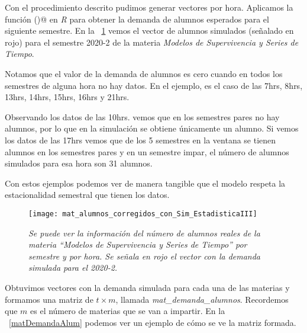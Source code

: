 Con el procedimiento descrito pudimos generar vectores por hora. Aplicamos la función \verb@hw()@ en \textit{R} para obtener la demanda de alumnos esperados para el siguiente semestre. En la \figurename{~\ref{matAl_corregidos_y_sim}} vemos el vector de alumnos simulados (señalado en rojo) para el semestre 2020-2 de la materia \textit{Modelos de Supervivencia y Series de Tiempo}.

Notamos que el valor de la demanda de alumnos es cero cuando en todos los semestres de alguna hora no hay datos. En el ejemplo, es el caso de las 7hrs, 8hrs, 13hrs, 14hrs, 15hrs, 16hrs y 21hrs.

Observando los datos de las 10hrs. vemos que en los semestres pares no hay alumnos, por lo que en la simulación se obtiene únicamente un alumno. Si vemos los datos de las 17hrs vemos que de los 5 semestres en la ventana se tienen alumnos en los semestres pares y en un semestre impar, el número de alumnos simulados para esa hora son 31 alumnos.

Con estos ejemplos podemos ver de manera tangible que el modelo respeta la estacionalidad semestral que tienen los datos.

\begin{figure}[H]
\centering
\texttt{[image: mat\_alumnos\_corregidos\_con\_Sim\_EstadisticaIII]} %
\caption[\textit{Matriz con alumnos de ``Modelos de Supervivencia y Series de Tiempo'' y vector con demanda simulada para el 2020-2.}]{\textit{Se puede ver la información del número de alumnos reales de la materia ``Modelos de Supervivencia y Series de Tiempo'' por semestre y por hora. Se señala en rojo el vector con la demanda simulada para el 2020-2.}}\label{matAl_corregidos_y_sim}
\end{figure}


Obtuvimos vectores con la demanda simulada para cada una de las materias y formamos una matriz de $t \times m$, llamada \textit{mat\_demanda\_alumnos}. Recordemos que $m$ es el número de materias que se van a impartir. En la \figurename{~\ref{matDemandaAlum}} podemos ver un ejemplo de cómo se ve la matriz formada.


